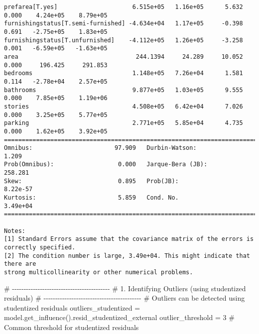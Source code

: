 \documentclass[
  letterpaper,
  DIV=11,
  numbers=noendperiod]{scrreprt}
\newenvironment{Shaded}{\begin{snugshade}}{\end{snugshade}}
\newcommand{\CommentTok}[1]{\textcolor[rgb]{0.37,0.37,0.37}{#1}}
\newcommand{\DecValTok}[1]{\textcolor[rgb]{0.68,0.00,0.00}{#1}}
\newcommand{\NormalTok}[1]{\textcolor[rgb]{0.00,0.23,0.31}{#1}}
\newcommand{\OperatorTok}[1]{\textcolor[rgb]{0.37,0.37,0.37}{#1}}
\begin{document}
\begin{verbatim}
prefarea[T.yes]                     6.515e+05   1.16e+05      5.632      0.000    4.24e+05    8.79e+05
furnishingstatus[T.semi-furnished] -4.634e+04   1.17e+05     -0.398      0.691   -2.75e+05    1.83e+05
furnishingstatus[T.unfurnished]    -4.112e+05   1.26e+05     -3.258      0.001   -6.59e+05   -1.63e+05
area                                 244.1394     24.289     10.052      0.000     196.425     291.853
bedrooms                            1.148e+05   7.26e+04      1.581      0.114   -2.78e+04    2.57e+05
bathrooms                           9.877e+05   1.03e+05      9.555      0.000    7.85e+05    1.19e+06
stories                             4.508e+05   6.42e+04      7.026      0.000    3.25e+05    5.77e+05
parking                             2.771e+05   5.85e+04      4.735      0.000    1.62e+05    3.92e+05
==============================================================================
Omnibus:                       97.909   Durbin-Watson:                   1.209
Prob(Omnibus):                  0.000   Jarque-Bera (JB):              258.281
Skew:                           0.895   Prob(JB):                     8.22e-57
Kurtosis:                       5.859   Cond. No.                     3.49e+04
==============================================================================

Notes:
[1] Standard Errors assume that the covariance matrix of the errors is correctly specified.
[2] The condition number is large, 3.49e+04. This might indicate that there are
strong multicollinearity or other numerical problems.
\end{verbatim}

\begin{Shaded}
\begin{Highlighting}[]
\CommentTok{\# {-}{-}{-}{-}{-}{-}{-}{-}{-}{-}{-}{-}{-}{-}{-}{-}{-}{-}{-}{-}{-}{-}{-}{-}{-}{-}{-}{-}{-}{-}{-}{-}{-}{-}{-}{-}{-}{-}{-}{-}{-}{-}}
\CommentTok{\# 1. Identifying Outliers (using studentized residuals)}
\CommentTok{\# {-}{-}{-}{-}{-}{-}{-}{-}{-}{-}{-}{-}{-}{-}{-}{-}{-}{-}{-}{-}{-}{-}{-}{-}{-}{-}{-}{-}{-}{-}{-}{-}{-}{-}{-}{-}{-}{-}{-}{-}{-}{-}}
\CommentTok{\# Outliers can be detected using studentized residuals}
\NormalTok{outliers\_studentized }\OperatorTok{=}\NormalTok{ model.get\_influence().resid\_studentized\_external}
\NormalTok{outlier\_threshold }\OperatorTok{=} \DecValTok{3}  \CommentTok{\# Common threshold for studentized residuals}
\end{Highlighting}
\end{Shaded}
\end{document}
